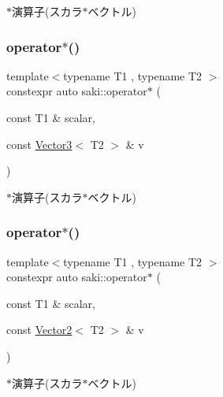 $\ast$演算子(スカラ$\ast$ベクトル) 

\mbox{\label{namespacesaki_a74073980f30054780d16bbda306bb0c4}} 
\subsubsection{\texorpdfstring{operator$\ast$()}{operator*()}\hspace{0.1cm}{\footnotesize\ttfamily [7/14]}}
{\footnotesize\ttfamily template$<$typename T1 , typename T2 $>$ \\
constexpr auto saki\+::operator$\ast$ (\begin{DoxyParamCaption}\item[{const T1 \&}]{scalar,  }\item[{const \mbox{\hyperlink{classsaki_1_1_vector3}{Vector3}}$<$ T2 $>$ \&}]{v }\end{DoxyParamCaption})}



$\ast$演算子(スカラ$\ast$ベクトル) 

\mbox{\label{namespacesaki_aec277082fba09344ebcffc5bdab6eb49}} 
\subsubsection{\texorpdfstring{operator$\ast$()}{operator*()}\hspace{0.1cm}{\footnotesize\ttfamily [8/14]}}
{\footnotesize\ttfamily template$<$typename T1 , typename T2 $>$ \\
constexpr auto saki\+::operator$\ast$ (\begin{DoxyParamCaption}\item[{const T1 \&}]{scalar,  }\item[{const \mbox{\hyperlink{classsaki_1_1_vector2}{Vector2}}$<$ T2 $>$ \&}]{v }\end{DoxyParamCaption})}



$\ast$演算子(スカラ$\ast$ベクトル) 

\mbox{\label{namespacesaki_a7bddc36f87a91453fa188323d7bbdaee}} 
